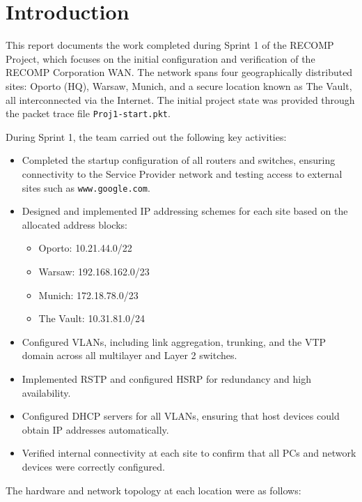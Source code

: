 \documentclass[a4paper,12pt]{report}
\begin{document}
\newpage


\chapter{Introduction}

This report documents the work completed during Sprint 1 of the \ac{RECOMP} Project, which focuses on the initial configuration and verification of the \ac{RECOMP} Corporation \ac{WAN}. The network spans four geographically distributed sites: Oporto (\ac{HQ}), Warsaw, Munich, and a secure location known as The Vault, all interconnected via the Internet. The initial project state was provided through the packet trace file \texttt{Proj1-start.pkt}.

During Sprint 1, the team carried out the following key activities:

\begin{itemize}
    \item Completed the startup configuration of all routers and switches, ensuring connectivity to the Service Provider network and testing access to external sites such as \texttt{www.google.com}.
    \item Designed and implemented IP addressing schemes for each site based on the allocated address blocks:
    \begin{itemize}
        \item Oporto: 10.21.44.0/22
        \item Warsaw: 192.168.162.0/23
        \item Munich: 172.18.78.0/23
        \item The Vault: 10.31.81.0/24
    \end{itemize}
    \item Configured \ac{VLAN}s, including link aggregation, trunking, and the \ac{VTP} domain across all multilayer and Layer 2 switches.
    \item Implemented \ac{RSTP} and configured \ac{HSRP} for redundancy and high availability.
    \item Configured \ac{DHCP} servers for all \ac{VLAN}s, ensuring that host devices could obtain \ac{IP} addresses automatically.
    \item Verified internal connectivity at each site to confirm that all PCs and network devices were correctly configured.
\end{itemize}

The hardware and network topology at each location were as follows:
\end{document}
